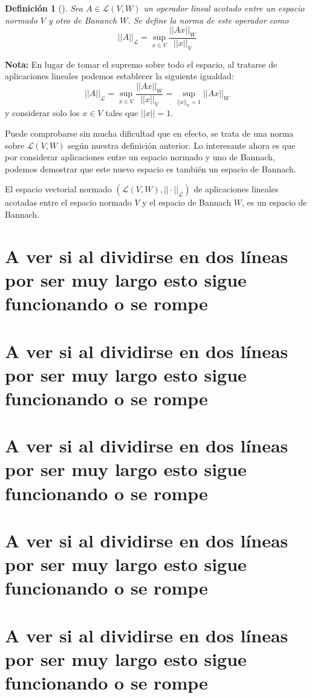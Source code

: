 \documentclass[12pt]{report}
\newtheorem{definition}{Definición}
\newenvironment{dft}[1][]
    {\begin{leftbar}\begin{definition}[#1]}
    {\end{definition}\end{leftbar}}
\begin{document}
\begin{dft}
Sea $A\in\mathcal{L}(V,W)$ un operador lineal acotado entre un espacio normado $V$ y otro de Bananch $W$. Se define la norma de este operador como
$$||A||_\mathcal{L}=\sup_{x\in V}\frac{||Ax||_W}{||x||_V}$$
\end{dft}

\textbf{Nota:} En lugar de tomar el supremo sobre todo el espacio, al tratarse de aplicaciones lineales podemos establecer la siguiente igualdad:
$$||A||_\mathcal{L}=\sup_{x\in V}\frac{||Ax||_W}{||x||_V}=\sup_{||x||_V=1}||Ax||_W$$
y considerar solo los $x\in V$ tales que $||x||=1$.

Puede comprobarse sin mucha dificultad que en efecto, se trata de una norma sobre $\mathcal{L}(V,W)$ según nuestra definición anterior. Lo interesante ahora es que por considerar aplicaciones entre un espacio normado y uno de Bannach, podemos demostrar que este nuevo espacio es también un espacio de Bannach.

\begin{thm}
El espacio vectorial normado $(\mathcal{L}(V,W),||\cdot ||_\mathcal{L})$ de aplicaciones lineales acotadas entre el espacio normado $V$ y el espacio de Bannach $W$, es un espacio de Bannach.
\end{thm}

\section{A ver si al dividirse en dos líneas por ser muy largo esto sigue funcionando o se rompe}
\section{A ver si al dividirse en dos líneas por ser muy largo esto sigue funcionando o se rompe}
\section{A ver si al dividirse en dos líneas por ser muy largo esto sigue funcionando o se rompe}
\section{A ver si al dividirse en dos líneas por ser muy largo esto sigue funcionando o se rompe}
\section{A ver si al dividirse en dos líneas por ser muy largo esto sigue funcionando o se rompe}
\end{document}
